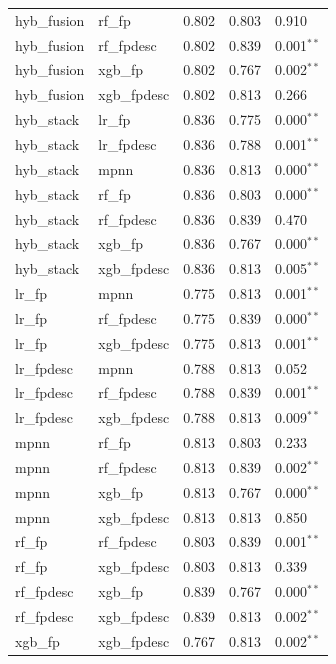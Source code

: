 \documentclass[conference]{IEEEtran}
\begin{document}
\begin{longtable}{llccl}
hyb\_fusion & rf\_fp & 0.802 & 0.803 & 0.910 \\
hyb\_fusion & rf\_fpdesc & 0.802 & 0.839 & 0.001$^{**}$ \\
hyb\_fusion & xgb\_fp & 0.802 & 0.767 & 0.002$^{**}$ \\
hyb\_fusion & xgb\_fpdesc & 0.802 & 0.813 & 0.266 \\
hyb\_stack & lr\_fp & 0.836 & 0.775 & 0.000$^{**}$ \\
hyb\_stack & lr\_fpdesc & 0.836 & 0.788 & 0.001$^{**}$ \\
hyb\_stack & mpnn & 0.836 & 0.813 & 0.000$^{**}$ \\
hyb\_stack & rf\_fp & 0.836 & 0.803 & 0.000$^{**}$ \\
hyb\_stack & rf\_fpdesc & 0.836 & 0.839 & 0.470 \\
hyb\_stack & xgb\_fp & 0.836 & 0.767 & 0.000$^{**}$ \\
hyb\_stack & xgb\_fpdesc & 0.836 & 0.813 & 0.005$^{**}$ \\
lr\_fp & mpnn & 0.775 & 0.813 & 0.001$^{**}$ \\
lr\_fp & rf\_fpdesc & 0.775 & 0.839 & 0.000$^{**}$ \\
lr\_fp & xgb\_fpdesc & 0.775 & 0.813 & 0.001$^{**}$ \\
lr\_fpdesc & mpnn & 0.788 & 0.813 & 0.052 \\
lr\_fpdesc & rf\_fpdesc & 0.788 & 0.839 & 0.001$^{**}$ \\
lr\_fpdesc & xgb\_fpdesc & 0.788 & 0.813 & 0.009$^{**}$ \\
mpnn & rf\_fp & 0.813 & 0.803 & 0.233 \\
mpnn & rf\_fpdesc & 0.813 & 0.839 & 0.002$^{**}$ \\
mpnn & xgb\_fp & 0.813 & 0.767 & 0.000$^{**}$ \\
mpnn & xgb\_fpdesc & 0.813 & 0.813 & 0.850 \\
rf\_fp & rf\_fpdesc & 0.803 & 0.839 & 0.001$^{**}$ \\
rf\_fp & xgb\_fpdesc & 0.803 & 0.813 & 0.339 \\
rf\_fpdesc & xgb\_fp & 0.839 & 0.767 & 0.000$^{**}$ \\
rf\_fpdesc & xgb\_fpdesc & 0.839 & 0.813 & 0.002$^{**}$ \\
xgb\_fp & xgb\_fpdesc & 0.767 & 0.813 & 0.002$^{**}$ \\
\end{longtable}
\twocolumn

\clearpage
\end{document}
